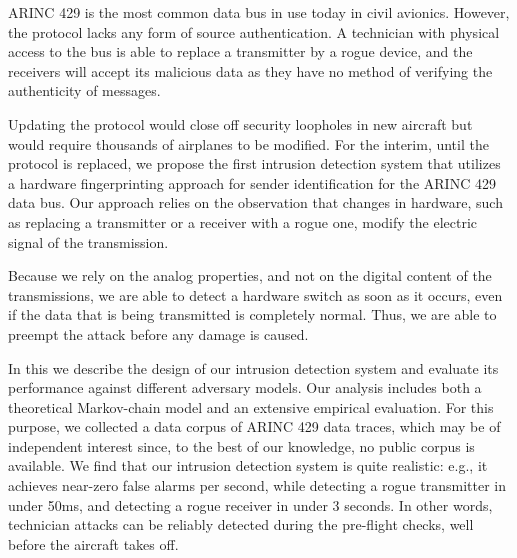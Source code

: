 ARINC 429 is the most common data bus in use today in civil avionics. 
However, the protocol lacks any form of source authentication. A technician with physical access to the bus is able to replace a transmitter by a rogue device, and the receivers will accept its malicious data as they have no method of verifying the authenticity of messages.

Updating the protocol would close off security loopholes in new aircraft but would require thousands of airplanes to be modified. For the interim, until the protocol is replaced, we propose the first intrusion detection system that utilizes a hardware fingerprinting approach for sender identification for the ARINC 429 data bus. Our approach relies on the observation that changes in hardware, such as replacing a transmitter or a receiver with a rogue one, modify the electric signal of the transmission. 

Because we rely on the analog properties, and not on the digital content of the transmissions, we are able to detect a hardware switch as soon as it occurs, even if the data that is being transmitted is completely normal. Thus, we are able to preempt the attack before any damage is caused.

In this \iftoggle{paper} {paper} {work} we describe the design of our intrusion detection system and evaluate its performance against different adversary models. Our analysis includes both a theoretical Markov-chain model and an extensive empirical evaluation. For this purpose, we collected a data corpus of ARINC 429 data traces, which may be of independent interest since, to the best of our knowledge, no public corpus is available. We find that our intrusion detection system is quite realistic: e.g., it achieves near-zero false alarms per second, while detecting a rogue transmitter in under 50ms, and detecting a rogue receiver in under 3 seconds. In other words, technician attacks can be reliably detected during the pre-flight checks, well before the aircraft takes off.